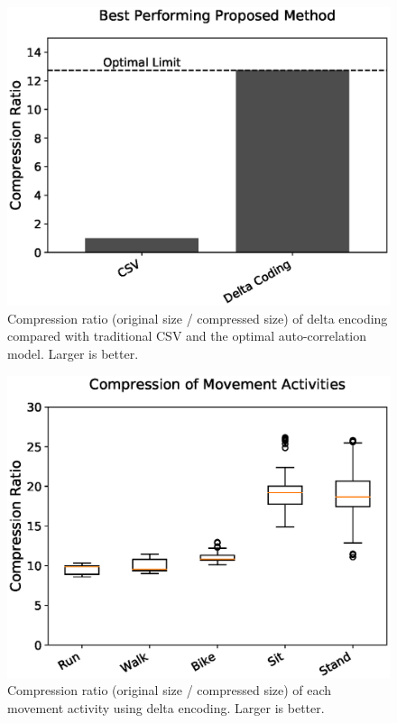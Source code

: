 \documentclass[journal]{IEEEtran}
\begin{document}
\begin{figure}

  \includegraphics[width=\linewidth]{diff.eps}
  \caption{Compression ratio (original size / compressed size) of delta encoding compared with traditional CSV and the optimal auto-correlation model. Larger is better.}
  \label{fig:main_results}
  
\end{figure}
\begin{figure}

  \includegraphics[width=\linewidth]{movement.eps}
  \caption{Compression ratio (original size / compressed size) of each movement activity using delta encoding. Larger is better.}
  \label{fig:movements}
  
\end{figure}
\end{document}
